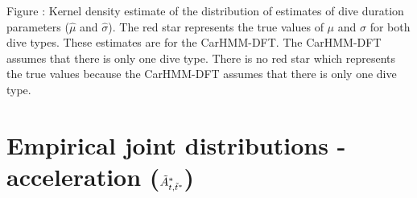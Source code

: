 \documentclass{article}
\begin{document}
        \noindent Figure : Kernel density estimate of the distribution of estimates of dive duration parameters ($\hat \mu$ and $\hat \sigma$). The red star represents the true values of $\mu$ and $\sigma$ for both dive types. These estimates are for the CarHMM-DFT. The CarHMM-DFT assumes that there is only one dive type. There is no red star which represents the true values because the CarHMM-DFT assumes that there is only one dive type.
        \addtocounter{fignum}{1}
    
    \newpage
    \section{Empirical joint distributions - acceleration ($\tilde{A}^*_{t,\tilde t^*}$)}

        \begin{center}
\end{center}
\end{document}
